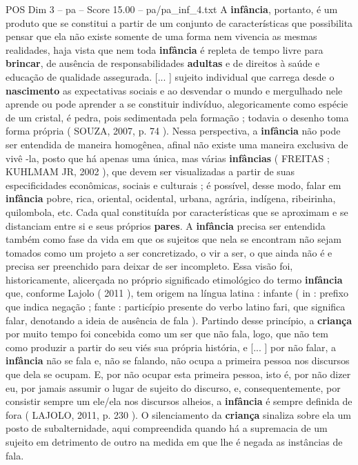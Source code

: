 \begin{textsample}{POS Dim 3 – pa – Score 15.00 – pa/pa\_inf\_4.txt}
A \textbf{infância}, portanto, é um produto que se constitui a partir de um conjunto de características que possibilita pensar que ela não existe somente de uma forma nem vivencia as mesmas realidades, haja vista que nem toda \textbf{infância} é repleta de tempo livre para \textbf{brincar}, de ausência de responsabilidades \textbf{adultas} e de direitos à saúde e educação de qualidade assegurada. [... ] sujeito individual que carrega desde o \textbf{nascimento} as expectativas sociais e ao desvendar o mundo e mergulhado nele aprende ou pode aprender a se constituir indivíduo, alegoricamente como espécie de um cristal, é pedra, pois sedimentada pela formação ; todavia o desenho toma forma própria ( SOUZA, 2007, p. 74 ).
Nessa perspectiva, a \textbf{infância} não pode ser entendida de maneira homogênea, afinal não existe uma maneira exclusiva de vivê -la, posto que há apenas uma única, mas várias \textbf{infâncias} ( FREITAS ; KUHLMAM JR, 2002 ), que devem ser visualizadas a partir de suas especificidades econômicas, sociais e culturais ; é possível, desse modo, falar em \textbf{infância} pobre, rica, oriental, ocidental, urbana, agrária, indígena, ribeirinha, quilombola, etc.
Cada qual constituída por características que se aproximam e se distanciam entre si e seus próprios \textbf{pares}.
A \textbf{infância} precisa ser entendida também como fase da vida em que os sujeitos que nela se encontram não sejam tomados como um projeto a ser concretizado, o vir a ser, o que ainda não é e precisa ser preenchido para deixar de ser incompleto.
Essa visão foi, historicamente, alicerçada no próprio significado etimológico do termo \textbf{infância} que, conforme Lajolo ( 2011 ), tem origem na língua latina : infante ( in : prefixo que indica negação ; fante : particípio presente do verbo latino fari, que significa falar, denotando a ideia de ausência de fala ).
Partindo desse princípio, a \textbf{criança} por muito tempo foi concebida como um ser que não fala, logo, que não tem como produzir a partir do seu viés sua própria história, e [... ] por não falar, a \textbf{infância} não se fala e, não se falando, não ocupa a primeira pessoa nos discursos que dela se ocupam.
E, por não ocupar esta primeira pessoa, isto é, por não dizer eu, por jamais assumir o lugar de sujeito do discurso, e, consequentemente, por consistir sempre um ele/ela nos discursos alheios, a \textbf{infância} é sempre definida de fora ( LAJOLO, 2011, p. 230 ).
O silenciamento da \textbf{criança} sinaliza sobre ela um posto de subalternidade, aqui compreendida quando há a supremacia de um sujeito em detrimento de outro na medida em que lhe é negada as instâncias de fala.

\end{textsample}
